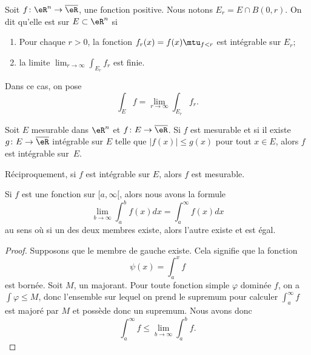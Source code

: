 Soit \( f\colon \eR^n\to \overline{ \eR }\), une fonction positive. Nous notons \( E_r=E\cap B(0,r)\). On dit qu'elle est  sur \( E\subset\eR^n\) si
\begin{enumerate}
	\item Pour chaque \( r>0\), la fonction \( f_r(x)=f(x)\mtu_{f<r}\) est intégrable sur \( E_r\);
	\item la limite \( \lim_{r\to\infty}\int_{E_r}f_r\) est finie.
\end{enumerate}
Dans ce cas, on pose
\begin{equation}
	\int_Ef=\lim_{r\to\infty}\int_{E_r}f_r.
\end{equation}

\begin{theorem}	\label{ThoFnTestIntnnBorn}
	Soit \( E\) mesurable dans \( \eR^n\) et \( f\colon E\to \overline{ \eR }\). Si \( f\) est mesurable et si il existe \( g\colon E\to \overline{ \eR }\) intégrable sur \( E\) telle que \( | f(x) |\leq g(x)\) pour tout \( x\in E\), alors \( f\) est intégrable sur~\( E\).

	Réciproquement, si \( f\) est intégrable sur \( E\), alors \( f\) est mesurable.
\end{theorem}

\begin{lemma}\label{LemTHBSEs}
	Si \( f\) est une fonction sur \( \mathopen[ a , \infty [\), alors nous avons la formule
	\begin{equation}
		\lim_{b\to \infty}\int_a^bf(x)dx=\int_a^{\infty}f(x)dx
	\end{equation}
	au sens où si un des deux membres existe, alors l'autre existe et est égal.
\end{lemma}

\begin{proof}
	Supposons que le membre de gauche existe. Cela signifie que la fonction
	\begin{equation}
		\psi(x)=\int_a^xf
	\end{equation}
	est bornée. Soit \( M\), un majorant. Pour toute fonction simple \( \varphi\) dominée \( f\), on a \( \int\varphi\leq M\), donc l'ensemble sur lequel on prend le supremum pour calculer \( \int_a^{\infty}f\) est majoré par \( M\) et possède donc un supremum. Nous avons donc
	\begin{equation}
		\int_a^{\infty}f\leq\lim_{b\to\infty}\int_a^bf.
	\end{equation}
\end{proof}


